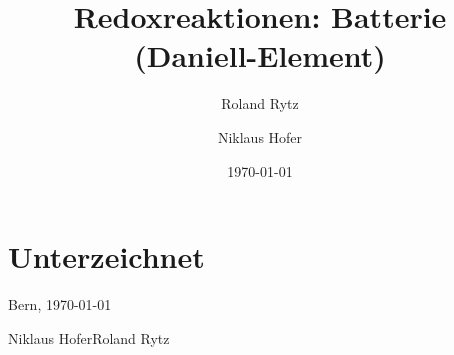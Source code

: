 \documentclass[11pt,paper=a4,final]{scrartcl}
\title{Redoxreaktionen: Batterie (Daniell-Element)}
\author{Roland Rytz \and Niklaus Hofer}
\date{\today{}}
\begin{document}
\maketitle
\newpage
\tableofcontents
\section{Unterzeichnet}
Bern, \today

\vspace{0.5cm}
\noindent
Niklaus Hofer\hfill Roland Rytz

\vspace{2cm}
\noindent
\hrulefill \hfill \hrulefill

\newpage
\listoftables
\listoffigures
{}

\end{document}
